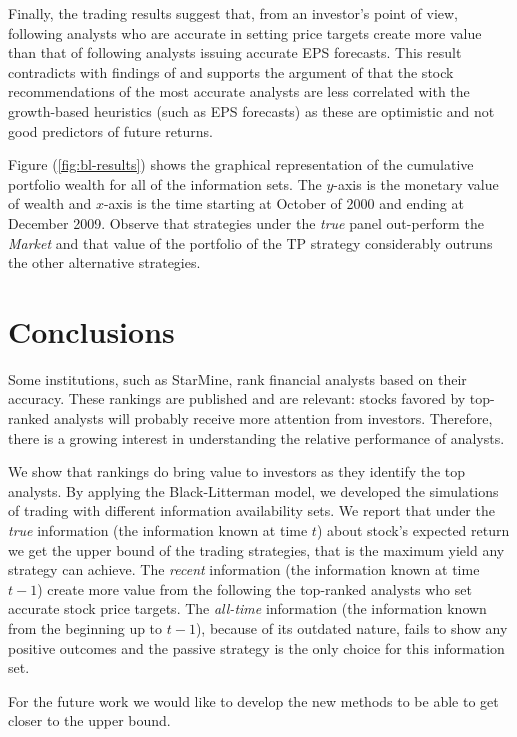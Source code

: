 \documentclass{article}\usepackage[]{graphicx}\usepackage[]{color}
\newcommand{\tr}{\textit{true}}
\newcommand{\naive}{\textit{recent}}
\newcommand{\default}{\textit{all-time}}
\begin{document}
Finally, the trading results suggest that, from an investor's point of view, following analysts who are accurate in setting price targets create more value than that of following analysts issuing accurate EPS forecasts. This result contradicts with findings of \cite{bradshaw2004} and supports the argument of \cite{simon2011} that the stock recommendations of the most accurate analysts are less correlated with the growth-based heuristics (such as EPS forecasts) as these are optimistic and not good predictors of future returns. 

Figure (\ref{fig:bl-results}) shows the graphical representation of the cumulative portfolio wealth for all of the information sets. The $y$-axis is the monetary value of wealth and $x$-axis is the time starting at October of  2000 and ending at December 2009. Observe that strategies under the \tr{} panel out-perform the \emph{Market} and that value of the portfolio of the TP strategy considerably outruns the other alternative strategies.

\section{Conclusions}
\label{sec:conclusion}

Some institutions, such as StarMine, rank financial analysts based on their accuracy. These rankings are published and are relevant: stocks favored by top-ranked analysts will probably receive more attention from investors. Therefore, there is a growing interest in understanding the relative performance of analysts.

We show that rankings do bring value to investors as they identify the top analysts. By applying the Black-Litterman model, we developed the simulations of trading with different information availability sets. We report that under the \tr{} information (the information known at time $t$) about stock's expected return we get the upper bound of the trading strategies, that is the maximum yield any strategy can achieve. The \naive{} information (the information known at time $t-1$) create more value from the following the top-ranked analysts who set accurate stock price targets. The \default{} information (the information known from the beginning up to $t-1$), because of its outdated nature, fails to show any positive outcomes and the passive strategy is the only choice for this information set.

For the future work we would like to develop the new methods to be able to get closer to the upper bound.
\end{document}
